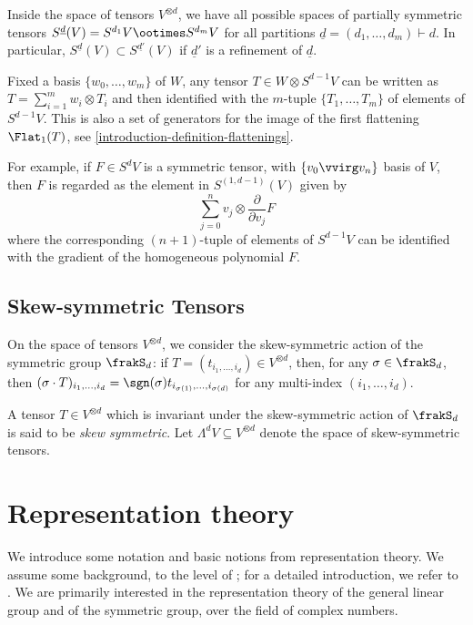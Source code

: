 Inside the space of tensors $V^{\otimes d}$, we have all possible spaces of partially symmetric tensors $S^{\underline{d}}(V) = S^{d_1} V \ootimes S^{d_m}V$ for all partitions $\underline{d} = (d_1,\ldots,d_m)\vdash d$. In particular, $S^{\underline{d}}(V) \subset S^{\underline{d'}}(V)$ if $\underline{d}'$ is a refinement of $\underline{d}$.

Fixed a basis $\{w_0,\ldots,w_m\}$ of $W$, any tensor $T \in W \otimes S^{d-1} V$ can be written as $T = \sum_{i=1}^m w_i \otimes T_i$ and then identified with the $m$-tuple $\{T_1,\ldots,T_m\}$ of elements of $S^{d-1} V$. This is also a set of generators for the image of the first flattening $\Flat_1(T)$, see \ref{introduction-definition-flattenings}.

For example, if $F \in S^d V$ is a symmetric tensor, with $\{v_0 \vvirg v_n\}$ basis of $V$, then $F$ is regarded as the element in $S^{(1,d-1)}(V)$ given by 
\[
    \sum_{j=0}^n v_j \otimes \textstyle\frac{\partial }{\partial v_j} F
\]
where the corresponding $(n+1)$-tuple of elements of $S^{d-1} V$ can be identified with the gradient of the homogeneous polynomial $F$.

\subsection{Skew-symmetric Tensors}
\label{introduction-subsection-skew_symmetric_tensors}
On the space of tensors $V^{\otimes d}$, we consider the skew-symmetric action of the symmetric group $\frakS_d$: if $T = (t_{i_1,\ldots,i_d}) \in V^{\otimes d}$, then, for any $\sigma \in \frakS_d$, then $(\sigma \cdot T)_{i_1,\ldots,i_d} = \sgn(\sigma)t_{i_{\sigma(1)},\ldots,i_{\sigma(d)}}$ for any multi-index $(i_1,\ldots,i_d)$.
\begin{definition}
\label{introduction-definition-skew_symmetric_tensors}
A tensor $T \in V^{\otimes d}$ which is invariant under the skew-symmetric action of $\frakS_d$ is said to be \emph{skew symmetric}. Let $\Lambda^d V \subseteq V^{\otimes d}$ denote the space of skew-symmetric tensors. 
\end{definition}

\section{Representation theory}
\label{introduction-section-repTheory}

We introduce some notation and basic notions from representation theory. We assume some background, to the level of \cite[Ch.6]{Lan12}; for a detailed introduction, we refer to \cite{FH91}. We are primarily interested in the representation theory of the general linear group and of the symmetric group, over the field of complex numbers.

